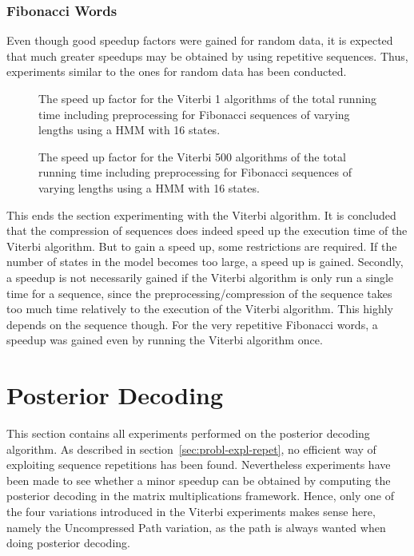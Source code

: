 \subsubsection{Fibonacci Words}

Even though good speedup factors were gained for random data, it is expected
that much greater speedups may be obtained by using repetitive
sequences. Thus, experiments similar to the ones for random data has been
conducted.

\begin{figure}
  \centering
  
  \caption{The speed up factor for the Viterbi 1 algorithms of the total
    running time including preprocessing for Fibonacci sequences of varying
    lengths using a HMM with 16 states.}
  \label{fig:fib_compressed_1_speedup_vs_sequence_length}
\end{figure}

\begin{figure}
  \centering
  
  \caption{The speed up factor for the Viterbi 500 algorithms of the total
    running time including preprocessing for Fibonacci sequences of varying
    lengths using a HMM with 16 states.}
  \label{fig:fib_compressed_500_speedup_vs_sequence_length}
\end{figure}


This ends the section experimenting with the Viterbi algorithm. It is concluded
that the compression of sequences does indeed speed up the execution time of
the Viterbi algorithm. But to gain a speed up, some restrictions are
required. If the number of states in the model becomes too large, a speed up is
gained. Secondly, a speedup is not necessarily gained if the Viterbi algorithm
is only run a single time for a sequence, since the preprocessing/compression of
the sequence takes too much time relatively to the execution of the Viterbi
algorithm. This highly depends on the sequence though. For the very repetitive
Fibonacci words, a speedup was gained even by running the Viterbi algorithm once.

\section{Posterior Decoding}

This section contains all experiments performed on the posterior decoding
algorithm. As described in section~\ref{sec:probl-expl-repet}, no efficient way
of exploiting sequence repetitions has been found. Nevertheless experiments
have been made to see whether a minor speedup can be obtained by computing the
posterior decoding in the matrix multiplications framework. Hence, only one of
the four variations introduced in the Viterbi experiments makes sense here,
namely the Uncompressed Path variation, as the path is always wanted when doing
posterior decoding.

